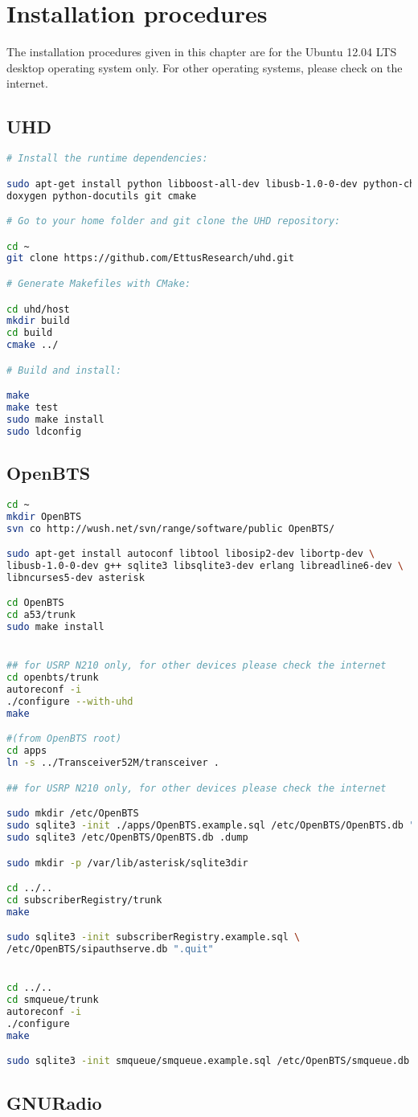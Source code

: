\chapter{Installation procedures}
The installation procedures given in this chapter are for the Ubuntu 12.04 LTS
desktop operating system only. For other operating systems, please check on
the internet.
\section{UHD}
\begin{lstlisting}[language=bash]
# Install the runtime dependencies:

sudo apt-get install python libboost-all-dev libusb-1.0-0-dev python-cheetah \
doxygen python-docutils git cmake

# Go to your home folder and git clone the UHD repository:

cd ~
git clone https://github.com/EttusResearch/uhd.git

# Generate Makefiles with CMake:

cd uhd/host
mkdir build
cd build
cmake ../

# Build and install:

make
make test
sudo make install
sudo ldconfig
\end{lstlisting}


\section{OpenBTS}

\begin{lstlisting}[language=bash]
cd ~
mkdir OpenBTS
svn co http://wush.net/svn/range/software/public OpenBTS/

sudo apt-get install autoconf libtool libosip2-dev libortp-dev \
libusb-1.0-0-dev g++ sqlite3 libsqlite3-dev erlang libreadline6-dev \
libncurses5-dev asterisk

cd OpenBTS
cd a53/trunk
sudo make install


## for USRP N210 only, for other devices please check the internet
cd openbts/trunk
autoreconf -i
./configure --with-uhd
make

#(from OpenBTS root)
cd apps
ln -s ../Transceiver52M/transceiver .

## for USRP N210 only, for other devices please check the internet

sudo mkdir /etc/OpenBTS
sudo sqlite3 -init ./apps/OpenBTS.example.sql /etc/OpenBTS/OpenBTS.db ".quit"
sudo sqlite3 /etc/OpenBTS/OpenBTS.db .dump

sudo mkdir -p /var/lib/asterisk/sqlite3dir

cd ../..
cd subscriberRegistry/trunk
make

sudo sqlite3 -init subscriberRegistry.example.sql \
/etc/OpenBTS/sipauthserve.db ".quit"


cd ../..
cd smqueue/trunk
autoreconf -i
./configure
make

sudo sqlite3 -init smqueue/smqueue.example.sql /etc/OpenBTS/smqueue.db ".quit"

\end{lstlisting}


\section{GNURadio}

\begin{lstlisting}[language=bash]


\end{lstlisting}